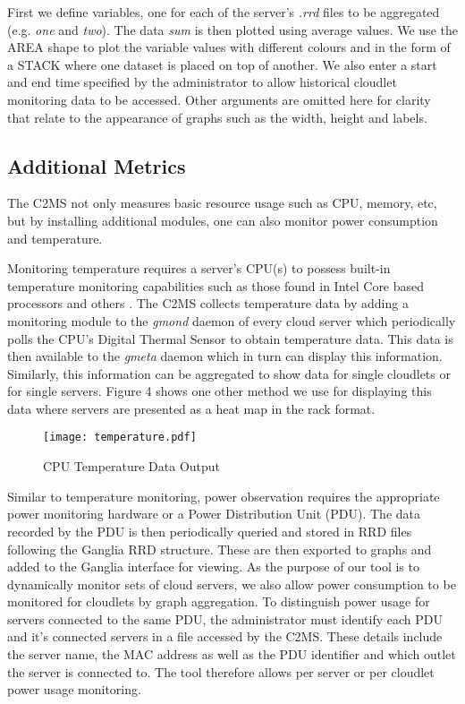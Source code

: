 \documentclass[10pt, conference, compsocconf]{IEEEtran}
\begin{document}
First we define variables, one for each of the server's \textit{.rrd} files to be aggregated (e.g. \textit{one} and \textit{two}). The data \textit{sum} is then plotted using average values. We use the AREA shape to plot the variable values with different colours and in the form of a STACK where one dataset is placed on top of another. We also enter a start and end time specified by the administrator to allow historical cloudlet monitoring data to be accessed. Other arguments are omitted here for clarity that relate to the appearance of graphs such as the width, height and labels.

\subsection{Additional Metrics}
The C2MS not only measures basic resource usage such as CPU, memory, etc, but by installing additional modules, one can also monitor power consumption and temperature.

Monitoring temperature requires a server's CPU(s) to possess built-in temperature monitoring capabilities such as those found in Intel Core based processors and others \cite{intel_temp}. The C2MS collects temperature data by adding a monitoring module to the \textit{gmond} daemon of every cloud server which periodically polls the CPU's Digital Thermal Sensor to obtain temperature data. This data is then available to the \textit{gmeta} daemon which in turn can display this information. Similarly, this information can be aggregated to show data for single cloudlets or for single servers. Figure 4 shows one other method we use for displaying this data where servers are presented as a heat map in the rack format.

\begin{figure}[h!]
  \begin{center}
\texttt{[image: temperature.pdf]}
  \end{center}
 \caption{CPU Temperature Data Output}
\end{figure}

Similar to temperature monitoring, power observation requires the appropriate power monitoring hardware or a Power Distribution Unit (PDU). The data recorded by the PDU is then periodically queried and stored in RRD files following the Ganglia RRD structure. These are then exported to graphs and added to the Ganglia interface for viewing. As the purpose of our tool is to dynamically monitor sets of cloud servers, we also allow power consumption to be monitored for cloudlets by graph aggregation. To distinguish power usage for servers connected to the same PDU, the administrator must identify each PDU and it's connected servers in a file accessed by the C2MS. These details include the server name, the MAC address as well as the PDU identifier and which outlet the server is connected to. The tool therefore allows per server or per cloudlet power usage monitoring.
\end{document}
